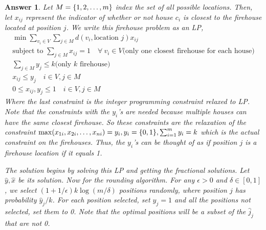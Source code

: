 \documentclass[12pt]{article}
\theoremstyle{colon}
\newtheorem*{answer}{Answer}
\begin{document}
\begin{answer}
  Let $M = \{1,2,\mathellipsis,m\}$ index the set of all possible locations. Then, let $x_{ij}$ represent the indicator of whether or not house $c_i$ is closest to the firehouse located at position $j$. We write this firehouse problem as an LP,
  \begin{gather*}
    \min \sum_{v_i \in V} \sum_{j \in M} d(v_i, \text{location } j) x_{ij} \\
    \text{subject to } \sum_{j \in M} x_{ij} = 1 \quad \forall \ v_i \in V \text{(only one closest firehouse for each house)} \\
    \sum_{j \in M} y_j \leq k \text{(only $k$ firehouse)} \\
    x_{ij} \leq y_j \quad i \in V, j \in M \\
    0 \leq x_{ij}, y_j \leq 1 \quad i \in V, j \in M
  \end{gather*}
  Where the last constraint is the integer programming constraint relaxed to LP. Note that the constraints with the $y_i$'s are needed because multiple houses can have the same closest firehouse. So these constraints are the relaxation of the constraint $\max (x_{1i}, x_{2i},\mathellipsis, x_{ni}) = y_i, y_i = \{0,1\}, \sum_{i=1}^m y_i = k$ which is the actual constraint on the firehouses. Thus, the $y_i$'s can be thought of as if position $j$ is a firehouse location if it equals 1.

  The solution begins by solving this LP and getting the fractional solutions. Let $\hat{y}, \hat{x}$ be its solution. Now for the rounding algorithm. For any $\epsilon > 0$ and $\delta \in [0,1]$, we select $(1+1/\epsilon) k \log{(m/\delta)}$ positions randomly, where position $j$ has probability $\hat{y}_j/k$. For each position selected, set $y_j = 1$ and all the positions not selected, set them to 0. Note that the optimal positions will be a subset of the $\hat{j}_{j}$ that are not 0.


\end{answer}
\end{document}
